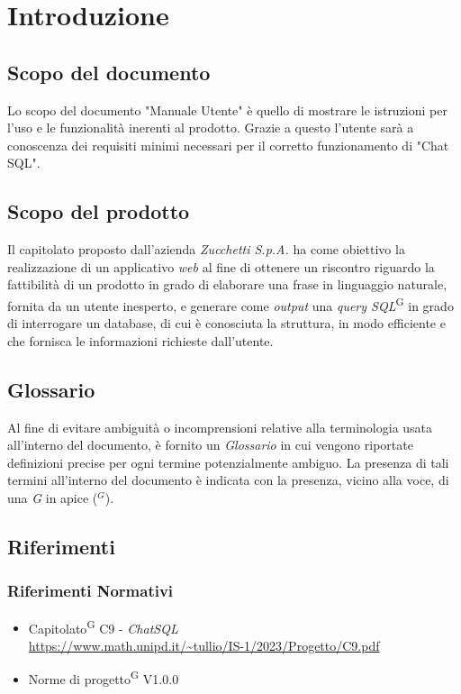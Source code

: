 \documentclass[5pt]{article}
\begin{document}
	
	
	\pagebreak
	\tableofcontents
	\pagebreak
	\listoftables
	\listoffigures
	\pagebreak
	
	
	\section{Introduzione}
		\subsection{Scopo del documento}
			Lo scopo del documento "Manuale Utente" è quello di mostrare le istruzioni per l'uso e le funzionalità inerenti al prodotto. Grazie a questo l'utente sarà a conoscenza dei requisiti minimi necessari per il corretto funzionamento di "Chat SQL".

		\subsection{Scopo del prodotto}
			Il capitolato proposto dall'azienda \textit{Zucchetti S.p.A.} ha come obiettivo la realizzazione di un applicativo \textit{web} al fine di ottenere un riscontro riguardo la fattibilità di un prodotto in grado di elaborare una frase in linguaggio naturale, fornita da un utente inesperto, e generare come \textit{output} una \textit{query SQL}\textsuperscript{G} in grado di interrogare un database, di cui è conosciuta la struttura, in modo efficiente e che fornisca le informazioni richieste dall'utente.

        \subsection{Glossario}
     		Al fine di evitare ambiguità o incomprensioni relative alla terminologia usata all'interno del documento, è fornito un \textit{Glossario} in cui vengono riportate definizioni precise per ogni termine potenzialmente ambiguo. La presenza di tali termini all'interno del documento è indicata con la presenza, vicino alla voce, di una \textit{G} in apice ($^G$). 

        \subsection{Riferimenti}
        
			\subsubsection{Riferimenti Normativi}
			\begin{itemize}
				\item Capitolato\textsuperscript{G} C9 - \textit{ChatSQL} \\ \url{https://www.math.unipd.it/~tullio/IS-1/2023/Progetto/C9.pdf} 
				\item Norme di progetto\textsuperscript{G} V1.0.0
			\end{itemize}
			
\end{document}
